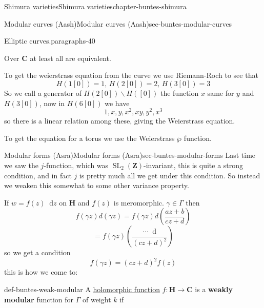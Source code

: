 \documentclass[oneside,10pt,]{book}
\newcommand{\terminology}[1]{\textbf{#1}}
\numberwithin{equation}{section}
\newcommand{\diff}{\mathop{}\!\mathrm{d}}
\newcommand{\lb}{[}
\newcommand{\rb}{]}
\newcommand{\ZZ}{\mathbf{Z}}
\newcommand{\CC}{\mathbf{C}}
\newcommand{\HH}{\mathbf{H}}
\DeclareMathOperator{\SL}{SL}
\begin{document}
\begin{chapterptx}{Shimura varieties}{}{Shimura varieties}{}{}{chapter-buntes-shimura}
\begin{sectionptx}{Modular curves (Aash)}{}{Modular curves (Aash)}{}{}{sec-buntes-modular-curves}
\begin{paragraphs}{Elliptic curves.}{paragraphs-40}
\begin{enumerate}
\end{enumerate}
%
\par
\hypertarget{p-1048}{}%
Over \(\CC\) at least all are equivalent.%
\par
\hypertarget{p-1049}{}%
To get the weierstrass equation from the curve we use Riemann-Roch to see that%
\begin{equation*}
H(1[0]) = 1,\, H(2[0]) = 2,\,H(3[0]) =3
\end{equation*}
So we call a generator of \(H(2\lb 0 \rb) \smallsetminus H(\lb 0 \rb)\) the function \(x\) same for \(y\) and \(H(3\lb 0 \rb)\), now in \(H(6 \lb 0 \rb)\) we have%
\begin{equation*}
1,x,y,x^2 ,xy,y^2,x^3
\end{equation*}
so there is a linear relation among these, giving the Weierstrass equation.%
\par
\hypertarget{p-1050}{}%
To get the equation for a torus we use the Weierstrass \(\wp\) function.%
\end{paragraphs}%
\end{sectionptx}
%
%
\typeout{************************************************}
\typeout{************************************************}
%
\begin{sectionptx}{Modular forms (Asra)}{}{Modular forms (Asra)}{}{}{sec-buntes-modular-forms}
\hypertarget{p-1051}{}%
Last time we saw the \(j\)-function, which was \(\SL_2(\ZZ)\)-invariant, this is quite a strong condition, and in fact \(j\) is pretty much all we get under this condition. So instead we weaken this somewhat to some other variance property.%
\par
\hypertarget{p-1052}{}%
If \(w = f(z) \diff z\) on \(\HH\) and \(f(z)\) is meromorphic. \(\gamma \in \Gamma\) then%
\begin{equation*}
f(\gamma z) d(\gamma z) = f(\gamma z) d\left( \frac{az+b}{cz+d} \right)
\end{equation*}
%
\begin{equation*}
= f(\gamma z) \left( \frac{\cdots \diff }{(cz+d)^2} \right)
\end{equation*}
so we get a condition%
\begin{equation*}
f(\gamma z) = (cz+d)^2 f(z)
\end{equation*}
this is how we come to:%
\begin{definition}{}{def-buntes-weak-modular}%
\hypertarget{p-1053}{}%
A \hyperref[def-morph-riem-surf]{holomorphic function} \(f\colon \HH \to \CC\) is a \terminology{weakly modular} function for \(\Gamma\) of weight \(k\) if%

\end{definition}
\end{sectionptx}
\end{chapterptx}
\end{document}

